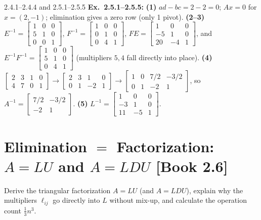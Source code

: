 \documentclass[11pt,a4paper,openany,oneside]{book}
\def\vect#1{#1}%
\def\mathbf#1{#1}%
\def\bk#1{ [Book #1]}%
\newcommand{\vect}[1]{\mathbf{#1}}
\numberwithin{equation}{chapter}
\newcommand{\bk}[1]{\texorpdfstring{\enspace{\normalfont\small\color{slate}[Book #1]}}{ [Book #1]}}
\begin{document}
\begin{pageend_sol}{2.4.1--2.4.4 and 2.5.1--2.5.5}
\textbf{Ex.\ 2.5.1--2.5.5:} \textbf{(1)} $ad-bc = 2-2=0$; $A\vect{x}=\vect{0}$ for $\vect{x}=(2,-1)$; elimination gives a zero row (only 1 pivot). \textbf{(2--3)} $E^{-1}=\begin{bmatrix}1&0&0\\5&1&0\\0&0&1\end{bmatrix}$, $F^{-1}=\begin{bmatrix}1&0&0\\0&1&0\\0&4&1\end{bmatrix}$, $FE = \begin{bmatrix}1&0&0\\-5&1&0\\20&-4&1\end{bmatrix}$, and $E^{-1}F^{-1} = \begin{bmatrix}1&0&0\\5&1&0\\0&4&1\end{bmatrix}$ (multipliers $5,4$ fall directly into place). \textbf{(4)} $\begin{bmatrix}2 & 3 & 1 & 0\\4 & 7 & 0 & 1\end{bmatrix} \to \begin{bmatrix}2 & 3 & 1 & 0\\0 & 1 & -2 & 1\end{bmatrix} \to \begin{bmatrix}1 & 0 & 7/2 & -3/2\\0 & 1 & -2 & 1\end{bmatrix}$, so $A^{-1} = \begin{bmatrix}7/2 & -3/2\\-2 & 1\end{bmatrix}$. \textbf{(5)} $L^{-1} = \begin{bmatrix}1 & 0 & 0\\-3 & 1 & 0\\11 & -5 & 1\end{bmatrix}$.
\end{pageend_sol}
\clearpage

\section{Elimination $=$ Factorization: $A = LU$ and $A = LDU$\bk{2.6}}

\begin{goal}
Derive the triangular factorization $A = LU$ (and $A = LDU$), explain why the multipliers $\ell_{ij}$ go directly into $L$ without mix-up, and calculate the operation count $\frac{1}{3}n^3$.
\end{goal}
\end{document}
